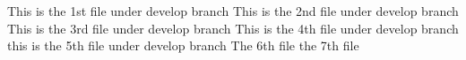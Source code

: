 This is the 1st file under develop branch
This is the 2nd file under develop branch
This is the 3rd file under develop branch
This is the 4th file under develop branch
this is the 5th file under develop branch
The 6th file  
the 7th file  
